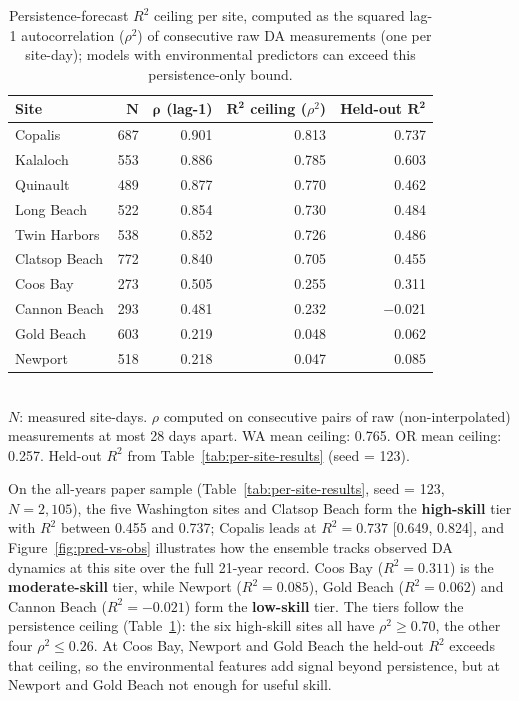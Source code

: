 \documentclass[toxins,article,submit,moreauthors]{Definitions/mdpi}
\begin{document}
\begin{table}[H]
\end{table}

\begin{table}[H]
\caption{Persistence-forecast $R^2$ ceiling per site, computed as the squared lag-1 autocorrelation ($\rho^2$) of consecutive raw DA measurements (one per site-day); models with environmental predictors can exceed this persistence-only bound.}
\label{tab:predictability-ceiling}
\centering\small
\begin{tabular*}{\linewidth}{@{\extracolsep{\fill}}lrrrr}
\toprule
\textbf{Site} & $\boldsymbol{N}$ & $\boldsymbol{\rho}$ \textbf{(lag-1)} & $\boldsymbol{R^2}$ \textbf{ceiling} ($\rho^2$) & \textbf{Held-out} $\boldsymbol{R^2}$ \\
\midrule
Copalis       & 687 & 0.901 & 0.813 & 0.737 \\
Kalaloch      & 553 & 0.886 & 0.785 & 0.603 \\
Quinault      & 489 & 0.877 & 0.770 & 0.462 \\
Long Beach    & 522 & 0.854 & 0.730 & 0.484 \\
Twin Harbors  & 538 & 0.852 & 0.726 & 0.486 \\
Clatsop Beach & 772 & 0.840 & 0.705 & 0.455 \\
\addlinespace
Coos Bay      & 273 & 0.505 & 0.255 & 0.311 \\
Cannon Beach  & 293 & 0.481 & 0.232 & $-$0.021 \\
Gold Beach    & 603 & 0.219 & 0.048 & 0.062 \\
Newport       & 518 & 0.218 & 0.047 & 0.085 \\
\bottomrule
\end{tabular*}
\vspace{0.3em}\\
\footnotesize{$N$: measured site-days. $\rho$ computed on consecutive pairs of raw (non-interpolated) measurements at most 28 days apart. WA mean ceiling: 0.765. OR mean ceiling: 0.257. Held-out $R^2$ from Table~\ref{tab:per-site-results} (seed = 123).}
\end{table}

On the all-years paper sample (Table~\ref{tab:per-site-results}, seed = 123, $N = 2{,}105$), the five Washington sites and Clatsop Beach form the \textbf{high-skill} tier with $R^2$ between 0.455 and 0.737; Copalis leads at $R^2 = 0.737$ [0.649, 0.824], and Figure~\ref{fig:pred-vs-obs} illustrates how the ensemble tracks observed DA dynamics at this site over the full 21-year record. Coos Bay ($R^2 = 0.311$) is the \textbf{moderate-skill} tier, while Newport ($R^2 = 0.085$), Gold Beach ($R^2 = 0.062$) and Cannon Beach ($R^2 = -0.021$) form the \textbf{low-skill} tier. The tiers follow the persistence ceiling (Table~\ref{tab:predictability-ceiling}): the six high-skill sites all have $\rho^2 \geq 0.70$, the other four $\rho^2 \leq 0.26$. At Coos Bay, Newport and Gold Beach the held-out $R^2$ exceeds that ceiling, so the environmental features add signal beyond persistence, but at Newport and Gold Beach not enough for useful skill.
\end{document}
